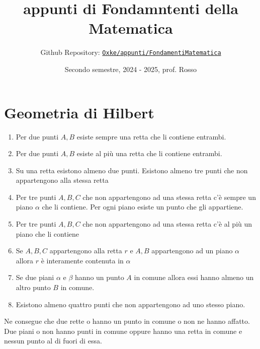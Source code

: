 

\title{appunti di Fondamntenti della Matematica}
\author{Github Repository:
\href{https://github.com/Oxke/appunti/tree/main/FondamentiMatematica}{\texttt{Oxke/appunti/FondamentiMatematica}}}

\date{Secondo semestre, 2024 \-- 2025, prof. Rosso}



\maketitle

\section{Geometria di Hilbert}

\begin{enumerate}[label = I\arabic*.]
    \item Per due punti \(A, B\) esiste sempre una retta che li contiene
        entrambi.
    \item Per due punti \(A, B\) esiste al più una retta che li contiene
        entrambi.
    \item Su una retta esistono almeno due punti. Esistono almeno tre punti che
        non appartengono alla stessa retta
    \item Per tre punti \(A, B, C\) che non appartengono ad una stessa retta c'è
        sempre un piano \(\alpha\) che li contiene. Per ogni piano esiste un
        punto che gli appartiene.
    \item Per tre punti \(A, B, C\) che non appartengono ad una stessa retta c'è
        al più un piano che li contiene
    \item Se \(A, B, C\) appartengono alla retta \(r\) e \(A, B\) appartengono
        ad un piano \(\alpha\) allora \(r\) è interamente contenuta in \(\alpha\) 
    \item Se due piani \(\alpha\) e \(\beta\) hanno un punto \(A\) in comune
        allora essi hanno almeno un altro punto \(B\) in comune.
    \item Esistono almeno quattro punti che non appartengono ad uno stesso
        piano.
\end{enumerate}

Ne consegue che due rette o hanno un punto in comune o non ne hanno affatto. Due
piani o non hanno punti in comune oppure hanno una retta in comune e nessun
punto al di fuori di essa.

